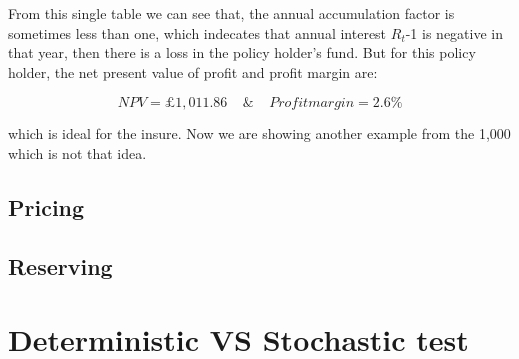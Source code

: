 \documentclass{report}
\begin{document}
From this single table we can see that, the annual accumulation factor is sometimes less than one, which indecates that annual interest $R_t$-1 is negative in that year, then there is a loss in the policy holder's fund. But for this policy holder, the net present value of profit and profit margin are: 

\[
NPV=\pounds 1,011.86\ \ \ \   \   \& \    \ \ \ \       Profit margin = 2.6\%
\]

which is ideal for the insure. Now we are showing another example from the 1,000 which is not that idea.








\subsection{Pricing}

\subsection{Reserving}



\section{Deterministic VS Stochastic test}
\end{document}
